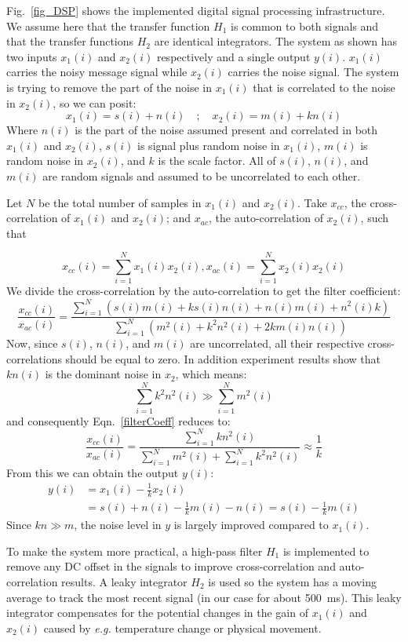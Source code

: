 Fig.~\ref{fig_DSP} shows the implemented digital signal processing infrastructure.  We assume here that the transfer function $H_1$ is common to both signals and that the transfer functions $H_2$ are identical integrators.  The system as shown has two inputs $x_1(i)$ and $x_2(i)$ respectively and a single output $y(i)$.  $x_1(i)$ carries the noisy message signal while $x_2(i)$ carries the noise signal.  The system is trying to remove the part of the noise in $x_1(i)$ that is correlated to the noise in $x_2(i)$, so we can posit:
$$x_1(i)=s(i)+n(i) \quad;\quad x_2(i)=m(i)+kn(i)$$
Where $n(i)$ is the part of the noise assumed present and correlated in both $x_1(i)$ and $x_2(i)$, $s(i)$ is signal plus random noise in $x_1(i)$, $m(i)$ is random noise in $x_2(i)$, and $k$ is the scale factor.  All of $s(i)$, $n(i)$, and $m(i)$ are random signals and assumed to be uncorrelated to each other.

Let $N$ be the total number of samples in $x_1(i)$ and $x_2(i)$.  Take $x_{cc}$, the cross-correlation of $x_1(i)$ and $x_2(i)$; and $x_{ac}$, the auto-correlation of $x_2(i)$, such that

$$x_{cc}(i)=\displaystyle\sum_{i=1}^{N} x_1(i)x_2(i), x_{ac}(i)=\displaystyle\sum_{i=1}^{N} x_2(i)x_2(i)$$
We divide the cross-correlation by the auto-correlation to get the filter coefficient:
\begin{equation}
\label{filterCoeff}
    \frac{x_{cc}(i)}{x_{ac}(i)} =\frac{\displaystyle\sum_{i=1}^{N} \left(s(i)m(i)+ks(i)n(i)+n(i)m(i)+n^2(i)k\right)}{\displaystyle\sum_{i=1}^{N} \left(m^2(i)+k^2n^2(i)+2km(i)n(i)\right)}
\end{equation}
Now, since $s(i)$, $n(i)$, and $m(i)$ are uncorrelated, all their respective cross-correlations should be equal to zero. In addition experiment results show that $kn(i)$ is the dominant noise in $x_2$, which means: 
$$
\sum_{i=1}^{N} k^2n^2(i) \gg \sum_{i=1}^{N} m^2(i)
$$
and consequently Eqn.~\ref{filterCoeff} reduces to:
$$
\frac{x_{cc}(i)}{x_{ac}(i)}=\frac{\displaystyle\sum_{i=1}^{N} kn^2(i)}{\displaystyle\sum_{i=1}^{N} m^2(i) + \displaystyle\sum_{i=1}^{N} k^2n^2(i)} \approx \frac{1}{k} 
$$
From this we can obtain the output $y(i)$:
\begin{align*}
    y(i)&=x_1(i)-\frac{1}{k}x_2(i) \\
    &=s(i)+n(i)-\frac{1}{k}m(i)-n(i)=s(i)-\frac{1}{k}m(i)
\end{align*}
Since $kn \gg m$, the noise level in $y$ is largely improved compared to $x_1(i)$.

To make the system more practical, a high-pass filter $H_1$ is implemented to remove any DC offset in the signals to improve cross-correlation and auto-correlation results.  A leaky integrator $H_2$ is used so the system has a moving average to track the most recent signal (in our case for about \qty{500}{ms}).  This leaky integrator compensates for the potential changes in the gain of $x_1(i)$ and $x_2(i)$ caused by {\em e.g.} temperature change or physical movement.

